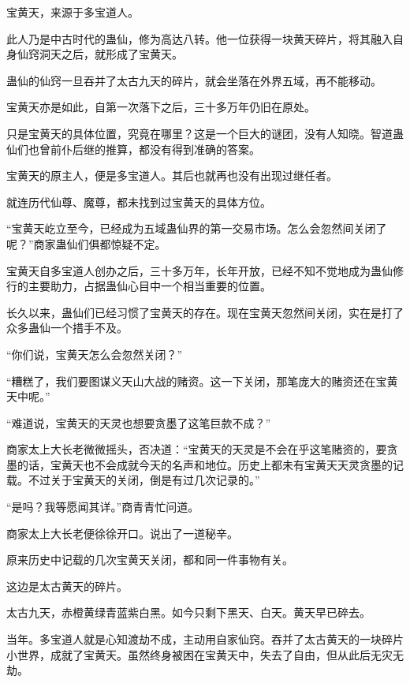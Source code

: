 
\begin{this_body}



宝黄天，来源于多宝道人。

此人乃是中古时代的蛊仙，修为高达八转。他一位获得一块黄天碎片，将其融入自身仙窍洞天之后，就形成了宝黄天。

蛊仙的仙窍一旦吞并了太古九天的碎片，就会坐落在外界五域，再不能移动。

宝黄天亦是如此，自第一次落下之后，三十多万年仍旧在原处。

只是宝黄天的具体位置，究竟在哪里？这是一个巨大的谜团，没有人知晓。智道蛊仙们也曾前仆后继的推算，都没有得到准确的答案。

宝黄天的原主人，便是多宝道人。其后也就再也没有出现过继任者。

就连历代仙尊、魔尊，都未找到过宝黄天的具体方位。

“宝黄天屹立至今，已经成为五域蛊仙界的第一交易市场。怎么会忽然间关闭了呢？”商家蛊仙们俱都惊疑不定。

宝黄天自多宝道人创办之后，三十多万年，长年开放，已经不知不觉地成为蛊仙修行的主要助力，占据蛊仙心目中一个相当重要的位置。

长久以来，蛊仙们已经习惯了宝黄天的存在。现在宝黄天忽然间关闭，实在是打了众多蛊仙一个措手不及。

“你们说，宝黄天怎么会忽然关闭？”

“糟糕了，我们要图谋义天山大战的赌资。这一下关闭，那笔庞大的赌资还在宝黄天中呢。”

“难道说，宝黄天的天灵也想要贪墨了这笔巨款不成？”

商家太上大长老微微摇头，否决道：“宝黄天的天灵是不会在乎这笔赌资的，要贪墨的话，宝黄天也不会成就今天的名声和地位。历史上都未有宝黄天天灵贪墨的记载。不过关于宝黄天的关闭，倒是有过几次记录的。”

“是吗？我等愿闻其详。”商青青忙问道。

商家太上大长老便徐徐开口。说出了一道秘辛。

原来历史中记载的几次宝黄天关闭，都和同一件事物有关。

这边是太古黄天的碎片。

太古九天，赤橙黄绿青蓝紫白黑。如今只剩下黑天、白天。黄天早已碎去。

当年。多宝道人就是心知渡劫不成，主动用自家仙窍。吞并了太古黄天的一块碎片小世界，成就了宝黄天。虽然终身被困在宝黄天中，失去了自由，但从此后无灾无劫。


\end{this_body}
